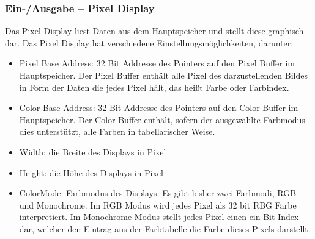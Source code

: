 \subsubsection{Ein-/Ausgabe -- Pixel Display}
Das Pixel Display liest Daten aus dem Hauptspeicher und stellt diese graphisch
dar. Das Pixel Display hat verschiedene Einstellungsmöglichkeiten, darunter:

\begin{itemize}
\item Pixel Base Address: 32 Bit Addresse des Pointers auf den Pixel Buffer im
Hauptspeicher. Der Pixel Buffer enthält alle Pixel des darzustellenden Bildes
in Form der Daten die jedes Pixel hält, das heißt Farbe oder Farbindex.

\item Color Base Address: 32 Bit Addresse des Pointers auf den Color Buffer im
Hauptspeicher. Der Color Buffer enthält, sofern der ausgewählte Farbmodus dies
unterstützt, alle Farben in tabellarischer Weise.

\item Width: die Breite des Displays in Pixel
\item Height: die Höhe des Displays in Pixel

\item ColorMode: Farbmodus des Displays. Es gibt bisher zwei Farbmodi, RGB und
Monochrome. Im RGB Modus wird jedes Pixel als 32 bit RBG Farbe interpretiert.
Im Monochrome Modus stellt jedes Pixel einen ein Bit Index dar, welcher den
Eintrag aus der Farbtabelle die Farbe dieses Pixels darstellt.
\end{itemize}


